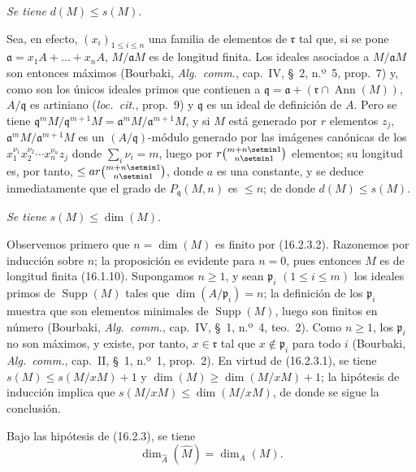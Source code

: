 \begin{env}[16.2.3.3]
\label{0.16.2.3.3-es}
\emph{Se tiene} $d(M)\leq s(M)$.
\end{env}

Sea, en efecto, $(x_i)_{1\leq i\leq n}$ una familia de elementos de
$\mathfrak{r}$ tal que, si se pone
$\mathfrak{a}=x_1A+\ldots+x_nA$, $M/\mathfrak{a}M$ es de longitud finita.
Los ideales asociados a $M/\mathfrak{a}M$ son entonces máximos (Bourbaki,
\emph{Alg.~comm.}, cap.~IV, \S~2, n.º~5, prop.~7) y, como son los únicos
ideales primos que contienen a
$\mathfrak{q}=\mathfrak{a}+(\mathfrak{r}\cap\operatorname{Ann}(M))$,
$A/\mathfrak{q}$ es artiniano (\emph{loc.~cit.}, prop.~9) y $\mathfrak{q}$ es
un ideal de definición de $A$. Pero se tiene
$\mathfrak{q}^mM/\mathfrak{q}^{m+1}M=
\mathfrak{a}^mM/\mathfrak{a}^{m+1}M$, y si $M$ está generado por $r$ elementos
$z_j$, $\mathfrak{a}^mM/\mathfrak{a}^{m+1}M$ es un
$(A/\mathfrak{q})$-módulo generado por las imágenes canónicas de los
$x_1^{\nu_1}x_2^{\nu_2}\cdots x_n^{\nu_n}z_j$ donde
$\sum_i\nu_i=m$, luego por $r\binom{m+n\setmin 1}{n\setmin 1}$ elementos; su longitud es,
por tanto, $\leq ar\binom{m+n\setmin 1}{n\setmin 1}$, donde $a$ es una constante, y se
deduce inmediatamente que el grado de $P_{\mathfrak{q}}(M,n)$ es $\leq n$;
de donde $d(M)\leq s(M)$.

\begin{env}[16.2.3.4]
\label{0.16.2.3.4-es}
\emph{Se tiene} $s(M)\leq\dim(M)$.
\end{env}

Observemos primero que $n=\dim(M)$ es finito por (16.2.3.2). Razonemos por
inducción sobre $n$; la proposición es evidente para $n=0$, pues entonces $M$
es de longitud finita (16.1.10). Supongamos $n\geq1$, y sean
$\mathfrak{p}_i$ $(1\leq i\leq m)$ los ideales primos de
$\operatorname{Supp}(M)$ tales que $\dim(A/\mathfrak{p}_i)=n$; la definición
de los $\mathfrak{p}_i$ muestra que son elementos minimales de
$\operatorname{Supp}(M)$, luego son finitos en número (Bourbaki,
\emph{Alg.~comm.}, cap.~IV, \S~1, n.º~4, teo.~2). Como $n\geq1$, los
$\mathfrak{p}_i$ no son máximos, y existe, por tanto,
$x\in\mathfrak{r}$ tal que $x\notin\mathfrak{p}_i$ para todo $i$ (Bourbaki,
\emph{Alg.~comm.}, cap.~II, \S~1, n.º~1, prop.~2). En virtud de (16.2.3.1),
se tiene $s(M)\leq s(M/xM)+1$ y $\dim(M)\geq\dim(M/xM)+1$; la hipótesis de
inducción implica que $s(M/xM)\leq\dim(M/xM)$, de donde se sigue la conclusión.

\begin{corollary}[16.2.4]
\label{0.16.2.4-es}
Bajo las hipótesis de \textup{(16.2.3)}, se tiene
\begin{equation}
\label{0.16.2.4.1-es}
\tag{16.2.4.1}
  \dim_{\widehat{A}}(\widehat{M})=\dim_A(M).
\end{equation}
\end{corollary}

